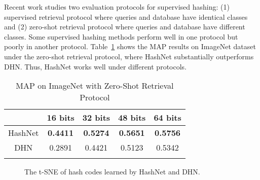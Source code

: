 \documentclass[10pt,twocolumn,letterpaper]{article}
\begin{document}
Recent work \cite{cite:TIP17HSL} studies two evaluation protocols for supervised hashing: (1) supervised retrieval protocol where queries and database have identical classes and (2) zero-shot retrieval protocol where queries and database have different classes. Some supervised hashing methods perform well in one protocol but poorly in another protocol. Table~\ref{table:zeroshot} shows the MAP results on ImageNet dataset under the zero-shot retrieval protocol, where HashNet substantially outperforms DHN. Thus, HashNet works well under different protocols.

\begin{table}[!tbp]
    \centering
    \addtolength{\tabcolsep}{3pt}
    \caption{MAP on ImageNet with Zero-Shot Retrieval Protocol \cite{cite:TIP17HSL}}
    \label{table:zeroshot}
    \begin{tabular}{c|cccc}
        \Xhline{1.0pt}{\centering Method} & 16 bits & 32 bits  & 48 bits  & 64 bits \\
        \hline
        HashNet & \textbf{0.4411} & \textbf{0.5274} & \textbf{0.5651} & \textbf{0.5756} \\
        DHN \cite{cite:AAAI16DHN} & 0.2891 & 0.4421 & 0.5123 & 0.5342  \\
        \Xhline{1.0pt}
    \end{tabular}
    \vspace{-10pt}
\end{table}

\begin{figure}[!tbp]
    \centering
    \hspace{10pt}
    \caption{The t-SNE of hash codes learned by HashNet and DHN.}
    \label{fig:t-sne}
    \vspace{-10pt}
\end{figure}
\end{document}
